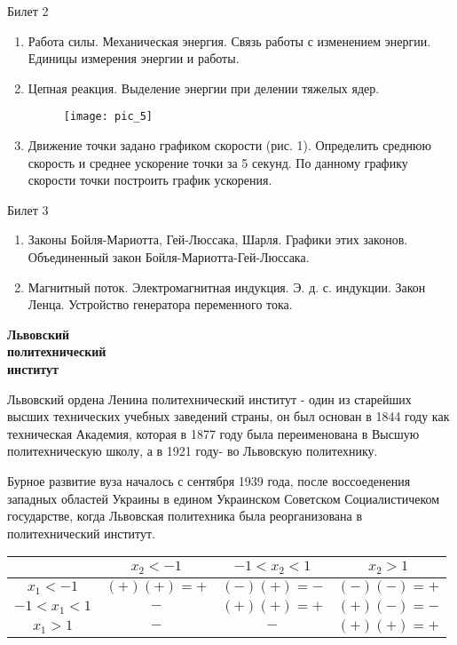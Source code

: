 \begin{center}
	{ Билет 2}
\end{center}

\begin{enumerate}
	\item Работа силы. Механическая энергия. Связь работы с изменением энергии. Единицы измерения энергии и работы.
	\item Цепная реакция. Выделение энергии при делении тяжелых ядер. 
	\begin{figure}[h]
		\centering
		\texttt{[image: pic\_5]}
		\caption{}
		\label{fig:circle}
	\end{figure}
	\item Движение точки задано графиком скорости (рис. 1). Определить среднюю скорость и среднее ускорение точки за 5 секунд. 
		По данному графику скорости точки построить график ускорения. 
\end{enumerate}

\begin{center}
	{ Билет 3}
\end{center}

\begin{enumerate}
	\item Законы Бойля-Мариотта, Гей-Люссака, Шарля. Графики этих законов. Объединенный закон Бойля-Мариотта-Гей-Люссака.
	\item Магнитный поток. Электромагнитная индукция. Э. д. с. индукции. Закон Ленца. Устройство генератора переменного тока.
 \end{enumerate}

\textbf{\Large{\noindent Львовский \\ политехнический \\ институт}}

Львовский ордена Ленина политехнический институт - один из старейших высших технических учебных заведений страны, он был основан в 1844 году как техническая Академия, которая в 1877 году была переименована в Высшую политехническую школу, а в 1921 году- во Львовскую политехнику.

Бурное развитие вуза началось с сентября 1939 года, после воссоеденения западных областей Украины в едином Украинском Советском Социалистичеком государстве, когда Львовская политехника была реорганизована в политехнический институт. 

\newpage

\begin{tabular}{ |c| c| c| c|}
\hline
 &  $x_2<-1$ & $-1<x_2<1$ & $x_2>1$ \\
\hline
$x_1<-1$  &  $(+)(+)=+$  &  $(-)(+)=-$  &  $(-)(-)=+$ \\
$-1<x_1<1$  &  $-$  &  $(+)(+)=+$  &  $(+)(-)=-$ \\
$x_1>1$  &  $-$  &  $-$  &  $(+)(+)=+$ \\
\hline
\end{tabular}


